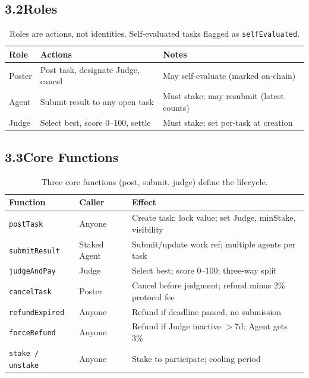 \documentclass[11pt,a4paper]{article}
\begin{document}
\subsection{3.2\quad Roles}

\begin{table}[H]\centering
\begin{tabular}{@{}lll@{}}
\toprule
\textbf{Role} & \textbf{Actions} & \textbf{Notes} \\
\midrule
Poster & Post task, designate Judge, cancel & May self-evaluate (marked on-chain) \\
Agent & Submit result to any open task & Must stake; may resubmit (latest counts) \\
Judge & Select best, score 0--100, settle & Must stake; set per-task at creation \\
\bottomrule
\end{tabular}
\caption{Roles are actions, not identities. Self-evaluated tasks flagged as \texttt{selfEvaluated}.}
\end{table}

\subsection{3.3\quad Core Functions}

\begin{table}[H]\centering\small
\begin{tabular}{@{}llp{5.6cm}@{}}
\toprule
\textbf{Function} & \textbf{Caller} & \textbf{Effect} \\
\midrule
\texttt{postTask} & Anyone & Create task; lock value; set Judge, minStake, visibility \\
\texttt{submitResult} & Staked Agent & Submit/update work ref; multiple agents per task \\
\texttt{judgeAndPay} & Judge & Select best; score 0--100; three-way split \\
\texttt{cancelTask} & Poster & Cancel before judgment; refund minus 2\% protocol fee \\
\texttt{refundExpired} & Anyone & Refund if deadline passed, no submission \\
\texttt{forceRefund} & Anyone & Refund if Judge inactive $>$7d; Agent gets 3\% \\
\texttt{stake / unstake} & Anyone & Stake to participate; cooling period \\
\bottomrule
\end{tabular}
\caption{Three core functions (post, submit, judge) define the lifecycle.}
\end{table}
\end{document}
